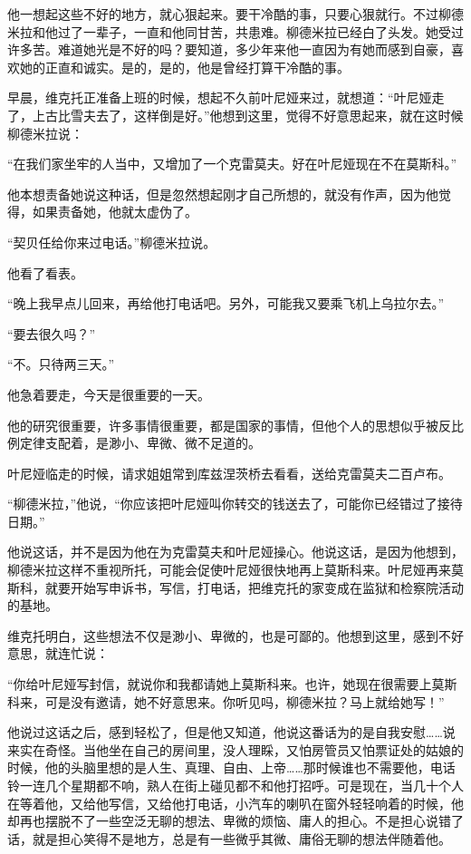 他一想起这些不好的地方，就心狠起来。要干冷酷的事，只要心狠就行。不过柳德米拉和他过了一辈子，一直和他同甘苦，共患难。柳德米拉已经白了头发。她受过许多苦。难道她光是不好的吗？要知道，多少年来他一直因为有她而感到自豪，喜欢她的正直和诚实。是的，是的，他是曾经打算干冷酷的事。

早晨，维克托正准备上班的时候，想起不久前叶尼娅来过，就想道：“叶尼娅走了，上古比雪夫去了，这样倒是好。”他想到这里，觉得不好意思起来，就在这时候柳德米拉说：

“在我们家坐牢的人当中，又增加了一个克雷莫夫。好在叶尼娅现在不在莫斯科。”

他本想责备她说这种话，但是忽然想起刚才自己所想的，就没有作声，因为他觉得，如果责备她，他就太虚伪了。

“契贝任给你来过电话。”柳德米拉说。

他看了看表。

“晚上我早点儿回来，再给他打电话吧。另外，可能我又要乘飞机上乌拉尔去。”

“要去很久吗？”

“不。只待两三天。”

他急着要走，今天是很重要的一天。

他的研究很重要，许多事情很重要，都是国家的事情，但他个人的思想似乎被反比例定律支配着，是渺小、卑微、微不足道的。

叶尼娅临走的时候，请求姐姐常到库兹涅茨桥去看看，送给克雷莫夫二百卢布。

“柳德米拉，”他说，“你应该把叶尼娅叫你转交的钱送去了，可能你已经错过了接待日期。”

他说这话，并不是因为他在为克雷莫夫和叶尼娅操心。他说这话，是因为他想到，柳德米拉这样不重视所托，可能会促使叶尼娅很快地再上莫斯科来。叶尼娅再来莫斯科，就要开始写申诉书，写信，打电话，把维克托的家变成在监狱和检察院活动的基地。

维克托明白，这些想法不仅是渺小、卑微的，也是可鄙的。他想到这里，感到不好意思，就连忙说：

“你给叶尼娅写封信，就说你和我都请她上莫斯科来。也许，她现在很需要上莫斯科来，可是没有邀请，她不好意思来。你听见吗，柳德米拉？马上就给她写！”

他说过这话之后，感到轻松了，但是他又知道，他说这番话为的是自我安慰……说来实在奇怪。当他坐在自己的房间里，没人理睬，又怕房管员又怕票证处的姑娘的时候，他的头脑里想的是人生、真理、自由、上帝……那时候谁也不需要他，电话铃一连几个星期都不响，熟人在街上碰见都不和他打招呼。可是现在，当几十个人在等着他，又给他写信，又给他打电话，小汽车的喇叭在窗外轻轻响着的时候，他却再也摆脱不了一些空泛无聊的想法、卑微的烦恼、庸人的担心。不是担心说错了话，就是担心笑得不是地方，总是有一些微乎其微、庸俗无聊的想法伴随着他。

